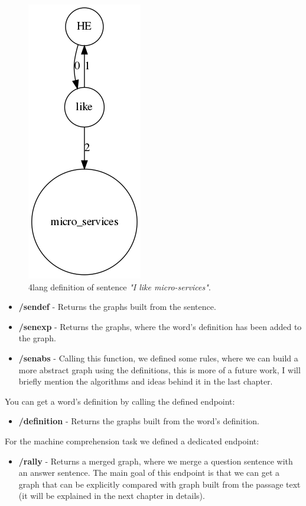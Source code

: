 \begin{figure}[!htb]
	\centering
	\includegraphics[scale=0.5]{figures/service}
	\caption{4lang definition of sentence \textit{"I like micro-services"}.}
	\label{fig:service}
\end{figure}

\begin{itemize}
	\item \textbf{/sendef} - Returns the graphs built from the sentence.
	\item \textbf{/senexp} - Returns the graphs, where the word's definition has been added to the graph.
	\item \textbf{/senabs} - Calling this function, we defined some rules, where we can build a more abstract graph using the definitions, this is more of a future work, I will briefly mention the algorithms and ideas behind it in the last chapter.
\end{itemize}
You can get a word's definition by calling the defined endpoint:
\begin{itemize}
	\item \textbf{/definition} - Returns the graphs built from the word's definition.
\end{itemize}
For the machine comprehension task we defined a dedicated endpoint:
\begin{itemize}
	\item \textbf{/rally} - Returns a merged graph, where we merge a question sentence with an answer sentence. The main goal of this endpoint is that we can get a graph that can be explicitly compared with graph built from the passage text (it will be explained in the next chapter in details). 
\end{itemize}


